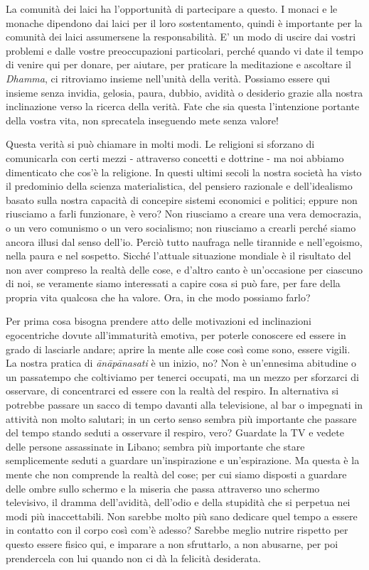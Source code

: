 La comunità dei laici ha l'opportunità di partecipare a questo. I monaci
e le monache dipendono dai laici per il loro sostentamento, quindi è
importante per la comunità dei laici assumersene la responsabilità. E'
un modo di uscire dai vostri problemi e dalle vostre preoccupazioni
particolari, perché quando vi date il tempo di venire qui per donare,
per aiutare, per praticare la meditazione e ascoltare il \textit{Dhamma}, ci
ritroviamo insieme nell'unità della verità. Possiamo essere qui insieme
senza invidia, gelosia, paura, dubbio, avidità o desiderio grazie alla
nostra inclinazione verso la ricerca della verità. Fate che sia questa
l'intenzione portante della vostra vita, non sprecatela inseguendo mete
senza valore!

Questa verità si può chiamare in molti modi. Le religioni si sforzano di
comunicarla con certi mezzi - attraverso concetti e dottrine - ma noi
abbiamo dimenticato che cos'è la religione. In questi ultimi secoli la
nostra società ha visto il predominio della scienza materialistica, del
pensiero razionale e dell'idealismo basato sulla nostra capacità di
concepire sistemi economici e politici; eppure non riusciamo a farli
funzionare, è vero? Non riusciamo a creare una vera democrazia, o un
vero comunismo o un vero socialismo; non riusciamo a crearli perché
siamo ancora illusi dal senso dell'io. Perciò tutto naufraga nelle
tirannide e nell'egoismo, nella paura e nel sospetto. Sicché l'attuale
situazione mondiale è il risultato del non aver compreso la realtà delle
cose, e d'altro canto è un'occasione per ciascuno di noi, se veramente
siamo interessati a capire cosa si può fare, per fare della propria vita
qualcosa che ha valore. Ora, in che modo possiamo farlo?

Per prima cosa bisogna prendere atto delle motivazioni ed inclinazioni
egocentriche dovute all'immaturità emotiva, per poterle conoscere ed
essere in grado di lasciarle andare; aprire la mente alle cose così come
sono, essere vigili. La nostra pratica di \textit{ānāpānasati} è un inizio, no?
Non è un'ennesima abitudine o un passatempo che coltiviamo per tenerci
occupati, ma un mezzo per sforzarci di osservare, di concentrarci ed
essere con la realtà del respiro. In alternativa si potrebbe passare un
sacco di tempo davanti alla televisione, al bar o impegnati in attività
non molto salutari; in un certo senso sembra più importante che passare
del tempo stando seduti a osservare il respiro, vero? Guardate la TV e
vedete delle persone assassinate in Libano; sembra più importante che
stare semplicemente seduti a guardare un'inspirazione e un'espirazione.
Ma questa è la mente che non comprende la realtà del cose; per cui siamo
disposti a guardare delle ombre sullo schermo e la miseria che passa
attraverso uno schermo televisivo, il dramma dell'avidità, dell'odio e
della stupidità che si perpetua nei modi più inaccettabili. Non sarebbe
molto più sano dedicare quel tempo a essere in contatto con il corpo
così com'è adesso? Sarebbe meglio nutrire rispetto per questo essere
fisico qui, e imparare a non sfruttarlo, a non abusarne, per poi
prendercela con lui quando non ci dà la felicità desiderata.

